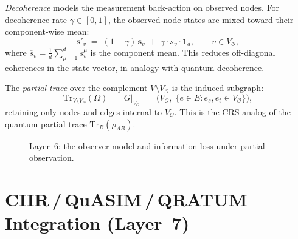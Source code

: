 \begin{definition}
\label{def:11.34}
\emph{Decoherence} models the measurement back-action on observed
nodes.  For decoherence rate $\gamma \in [0,1]$, the observed node
states are mixed toward their component-wise mean:
\begin{equation}
\label{eq:11.decoherence}
  \mathbf{s}'_v
  \;=\;
  (1 - \gamma)\,\mathbf{s}_v
  \;+\;
  \gamma \cdot \overline{s}_v \cdot \mathbf{1}_d,
  \qquad v \in V_{\mathcal{O}},
\end{equation}
where $\overline{s}_v = \frac{1}{d}\sum_{\mu=1}^d s_v^\mu$ is the
component mean.  This reduces off-diagonal coherences in the state
vector, in analogy with quantum decoherence.
\end{definition}

\begin{definition}
\label{def:11.35}
The \emph{partial trace} over the complement $V \setminus
V_{\mathcal{O}}$ is the induced subgraph:
\begin{equation}
\label{eq:11.partial_trace}
  \mathrm{Tr}_{V \setminus V_{\mathcal{O}}}(\Omega)
  \;=\;
  G\big|_{V_{\mathcal{O}}}
  \;=\;
  \bigl(V_{\mathcal{O}},\;
        \{e \in E : e_s, e_t \in V_{\mathcal{O}}\}
  \bigr),
\end{equation}
retaining only nodes and edges internal to $V_{\mathcal{O}}$.  This is
the CRS analog of the quantum partial trace $\mathrm{Tr}_B(\rho_{AB})$.
\end{definition}

\begin{figure}[t]
\centering
{}
\caption{Layer~6: the observer model and information loss under
  partial observation.}
\label{fig:c11:observer}
\end{figure}

\section{CIIR\,/\,QuASIM\,/\,QRATUM Integration (Layer~7)}
\label{sec:ch11:integration}

